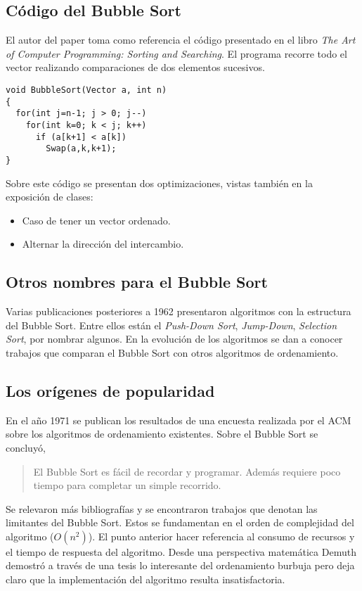 \documentclass[conference]{IEEEtran}
\begin{document}
\subsection{Código del Bubble Sort}
\label{sec:origen-bubble-sort}

El autor del paper toma como referencia el código presentado en el
libro \emph{The Art of Computer Programming: Sorting and
  Searching}. El programa recorre todo el vector realizando
comparaciones de dos elementos sucesivos.
\begin{verbatim}
void BubbleSort(Vector a, int n)
{
  for(int j=n-1; j > 0; j--)
    for(int k=0; k < j; k++)
      if (a[k+1] < a[k])
        Swap(a,k,k+1);
}
\end{verbatim}

Sobre este código se presentan dos optimizaciones, vistas también en
la exposición de clases:
\begin{itemize}
\item Caso de tener un vector ordenado.
\item Alternar la  dirección del intercambio.
\end{itemize}

\subsection{Otros nombres para el Bubble Sort}
\label{sec:origen-otro-nombre}

Varias publicaciones posteriores a 1962 presentaron algoritmos con la
estructura del Bubble Sort. Entre ellos están el \emph{Push-Down
  Sort}, \emph{Jump-Down}, \emph{Selection Sort}, por nombrar
algunos. En la evolución de los algoritmos se dan a conocer trabajos
que comparan el Bubble Sort con otros algoritmos de ordenamiento.

\subsection{Los orígenes de popularidad}
\label{sec:origen-popu}

En el año 1971 se publican los resultados de una encuesta realizada
por el ACM sobre los algoritmos de ordenamiento existentes. Sobre el
Bubble Sort se concluyó,
\begin{quote}
El Bubble Sort es fácil de recordar y programar. Además requiere poco
tiempo para completar un simple recorrido.   
\end{quote}

Se relevaron más bibliografías y se encontraron trabajos que denotan
las limitantes del Bubble Sort. Estos se fundamentan en el orden de
complejidad del algoritmo ($O(n^2)$). El punto anterior hacer
referencia al consumo de recursos y el tiempo de respuesta del
algoritmo. Desde una perspectiva matemática Demuth demostró a través
de una tesis lo interesante del ordenamiento burbuja pero deja claro
que la implementación del algoritmo resulta insatisfactoria. 
\end{document}
